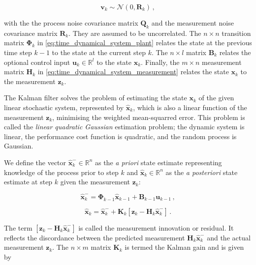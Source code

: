 \begin{equation}\label{eq:measurement_noise}
  \mathbf{v}_{k} \sim \mathcal{N}(0,\mathbf{R}_k)\,,
\end{equation}
 
\noindent
with the the process noise covariance matrix $\mathbf{Q}_k$ and the measurement noise covariance matrix $\mathbf{R}_k$. They are assumed to be uncorrelated. The $n\times n$ transition matrix $\mathbf{\Phi}_{k}$ in \ref{eq:time_dynamical_system_plant} relates the state at the previous time step $k-1$ to the state at the current step $k$. The $n\times l$ matrix $\mathbf{B}_{k}$ relates the optional control input $\mathbf{u}_k \in \mathbb{R}^l$ to the state $\mathbf{x}_k$. Finally, the $m\times n$ measurement matrix $\mathbf{H}_{k}$ in \ref{eq:time_dynamical_system_measurement} relates the state $\mathbf{x}_k$ to the measurement $\mathbf{z}_k$.

The Kalman filter solves the problem of estimating the state $\mathbf{x}_k$ of the given linear stochastic system, represented by $\hat{\mathbf{x}}_k$, which is also a linear function of the measurement $\mathbf{z}_k$, minimising the weighted mean-squarred error. This problem is called the \emph{linear quadratic Gaussian} estimation problem; the dynamic system is linear, the performance cost function is quadratic, and the random process is Gaussian.

We define the vector $\hat{\mathbf{x}}^-_k \in \mathbb{R}^n$ as the \emph{a priori} state estimate representing knowledge of the process prior to step $k$ and $\hat{\mathbf{x}}_k \in \mathbb{R}^n$ as the \emph{a posteriori} state estimate at step $k$ given the measurement $\mathbf{z}_k$:

\begin{equation}\label{eq:apriori_estimate}
  \hat{\mathbf{x}}^-_k = \mathbf{\Phi}_{k-1}\hat{\mathbf{x}}_{k-1}+\mathbf{B}_{k-1}\mathbf{u}_{k-1}\,,
\end{equation}

\begin{equation}\label{eq:aposteriori_estimate}
  \hat{\mathbf{x}}_k = \hat{\mathbf{x}}^-_k + \mathbf{K}_{k}[\mathbf{z}_k-\mathbf{H}_{k}\hat{\mathbf{x}}^-_k]\,.
\end{equation}

\noindent
The term $[\mathbf{z}_k-\mathbf{H}_{k}\hat{\mathbf{x}}^-_k]$ is called the measurement innovation or residual. It reflects the discordance between the predicted measurement $\mathbf{H}_{k}\hat{\mathbf{x}}^-_k$ and the actual measurement $\mathbf{z}_k$. The $n\times m$ matrix $\mathbf{K}_{k}$ is termed the Kalman gain and is given by


